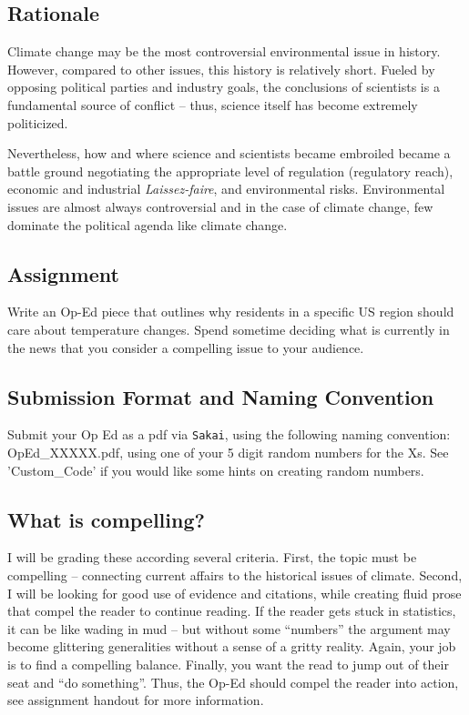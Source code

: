 
\subsection{Rationale}

Climate change may be the most controversial environmental issue in history. However, compared to other issues, this history is relatively short. Fueled by opposing political parties and industry goals, the conclusions of scientists is a fundamental source of conflict -- thus, science itself has become extremely politicized. 

Nevertheless, how and where science and scientists became embroiled became a battle ground negotiating the appropriate level of regulation (regulatory reach), economic and industrial \textit{Laissez-faire}, and environmental risks. Environmental issues are almost always controversial and in the case of climate change, few dominate the political agenda like climate change. 

\subsection{Assignment}

Write an Op-Ed piece that outlines why residents in a specific US region should care about temperature changes. Spend sometime deciding what is currently in the news that you consider a compelling issue to your audience.

\subsection{Submission Format and Naming Convention}

Submit your Op Ed as a pdf via \texttt{Sakai}, using the following naming convention: OpEd\_XXXXX.pdf, using one of your 5 digit random numbers for the Xs. See 'Custom\_Code' if you would like some hints on creating random numbers. 

\subsection{What is compelling?}

I will be grading these according several criteria. First, the topic must be compelling -- connecting current affairs to the historical issues of climate. Second, I will be looking for good use of evidence and citations, while creating fluid prose that compel the reader to continue reading. If the reader gets stuck in statistics, it can be like wading in mud -- but without some ``numbers'' the argument may become glittering generalities without a sense of a gritty reality. Again, your job is to find a compelling balance. Finally, you want the read to jump out of their seat and ``do something''. Thus, the Op-Ed should compel the reader into action, see assignment handout for more information.





